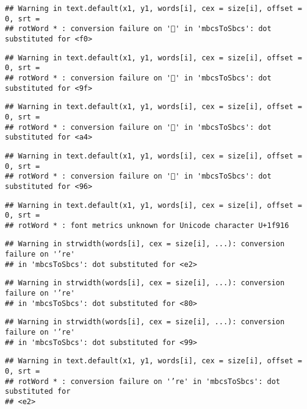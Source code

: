 \documentclass[
]{article}
\begin{document}
\begin{verbatim}
## Warning in text.default(x1, y1, words[i], cex = size[i], offset = 0, srt =
## rotWord * : conversion failure on '🤖' in 'mbcsToSbcs': dot substituted for <f0>
\end{verbatim}

\begin{verbatim}
## Warning in text.default(x1, y1, words[i], cex = size[i], offset = 0, srt =
## rotWord * : conversion failure on '🤖' in 'mbcsToSbcs': dot substituted for <9f>
\end{verbatim}

\begin{verbatim}
## Warning in text.default(x1, y1, words[i], cex = size[i], offset = 0, srt =
## rotWord * : conversion failure on '🤖' in 'mbcsToSbcs': dot substituted for <a4>
\end{verbatim}

\begin{verbatim}
## Warning in text.default(x1, y1, words[i], cex = size[i], offset = 0, srt =
## rotWord * : conversion failure on '🤖' in 'mbcsToSbcs': dot substituted for <96>
\end{verbatim}

\begin{verbatim}
## Warning in text.default(x1, y1, words[i], cex = size[i], offset = 0, srt =
## rotWord * : font metrics unknown for Unicode character U+1f916
\end{verbatim}

\begin{verbatim}
## Warning in strwidth(words[i], cex = size[i], ...): conversion failure on '’re'
## in 'mbcsToSbcs': dot substituted for <e2>
\end{verbatim}

\begin{verbatim}
## Warning in strwidth(words[i], cex = size[i], ...): conversion failure on '’re'
## in 'mbcsToSbcs': dot substituted for <80>
\end{verbatim}

\begin{verbatim}
## Warning in strwidth(words[i], cex = size[i], ...): conversion failure on '’re'
## in 'mbcsToSbcs': dot substituted for <99>
\end{verbatim}

\begin{verbatim}
## Warning in text.default(x1, y1, words[i], cex = size[i], offset = 0, srt =
## rotWord * : conversion failure on '’re' in 'mbcsToSbcs': dot substituted for
## <e2>
\end{verbatim}
\end{document}
